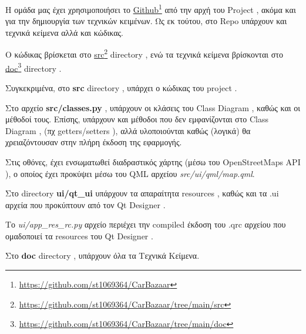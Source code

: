 \documentclass{../ol-softwaremanual}
\newcommand{\doclink}[2]{\href{#1}{#2}\footnote{\url{#1}}}
\begin{document}
	
	\newpage
	
	
	
	\flushleft
	
	Η ομάδα μας έχει χρησιμοποιήσει το \en \doclink{https://github.com/st1069364/CarBazaar}{Github} \gr από την αρχή του \en Project \gr, ακόμα και για την δημιουργία των τεχνικών κειμένων. Ως εκ τούτου, στο \en Repo \gr υπάρχουν και τεχνικά κείμενα αλλά και κώδικας. \break
	
	
	Ο κώδικας βρίσκεται στο \en \doclink{https://github.com/st1069364/CarBazaar/tree/main/src}{src} directory \gr, ενώ τα τεχνικά κείμενα βρίσκονται στο \en \doclink{https://github.com/st1069364/CarBazaar/tree/main/doc}{doc} directory \gr .\break
	
	Συγκεκριμένα, στο \en \textbf{src} directory \gr, υπάρχει ο κώδικας του \en project \gr. \break
	
	Στο αρχείο \en \textbf{src/classes.py} \gr, υπάρχουν οι κλάσεις του \en Class Diagram \gr, καθώς και οι μέθοδοί τους. Επίσης, υπάρχουν και μέθοδοι που δεν εμφανίζονται στο \en Class Diagram \gr, (πχ \en getters/setters \gr), αλλά υλοποιούνται καθώς (λογικά) θα χρειαζόντουσαν στην πλήρη έκδοση της εφαρμογής. \break	
	
	 \break
	
	 \break

	Στις οθόνες, έχει ενσωματωθεί διαδραστικός χάρτης (μέσω του \en OpenStreetMaps API \gr), ο οποίος έχει προκύψει μέσω του \en QML \gr αρχείου \en \textit{src/ui/qml/map.qml}\gr. \break	
	
	Στο \en directory \textbf{ui/qt\_ui} \gr υπάρχουν τα απαραίτητα \en resources \gr, καθώς και τα \en .ui \gr αρχεία που προκύπτουν από τον \en Qt Designer \gr. \break	
	
	Το \en \textit{ui/app\_res\_rc.py} \gr αρχείο περιέχει την \en compiled \gr έκδοση του \en .qrc \gr αρχείου που ομαδοποιεί τα \en resources \gr του \en Qt Designer \gr. \break
	
	
	Στο \en \textbf{doc} directory \gr, υπάρχουν όλα τα Τεχνικά Κείμενα. \break
	
\end{document}
